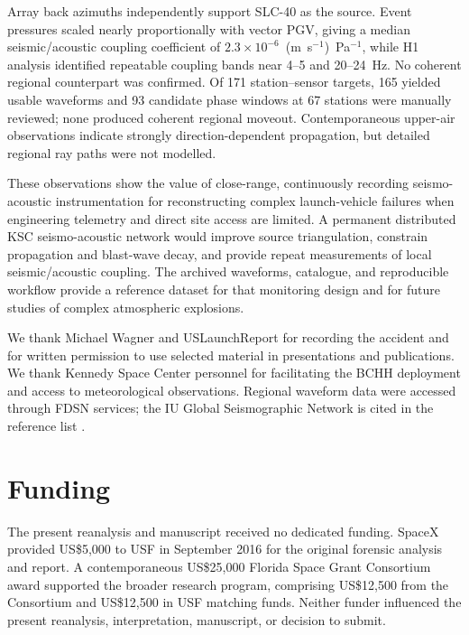 \documentclass[]{seismica}
\begin{document}
Array back azimuths independently support SLC-40 as the source. Event
pressures scaled nearly proportionally with vector PGV, giving a median
seismic/acoustic coupling coefficient of
$2.3\times10^{-6}$~(m~s$^{-1}$)~Pa$^{-1}$, while H1 analysis identified
repeatable coupling bands near 4--5 and 20--24~Hz. No coherent regional
counterpart was confirmed. Of 171 station--sensor targets, 165 yielded usable
waveforms and 93 candidate phase windows at 67 stations were manually
reviewed; none produced coherent regional moveout. Contemporaneous upper-air
observations indicate strongly direction-dependent propagation, but detailed
regional ray paths were not modelled.

These observations show the value of close-range, continuously recording
seismo-acoustic instrumentation for reconstructing complex launch-vehicle
failures when engineering telemetry and direct site access are limited. A
permanent distributed KSC seismo-acoustic network would improve source
triangulation, constrain propagation and blast-wave decay, and provide repeat
measurements of local seismic/acoustic coupling. The archived waveforms,
catalogue, and reproducible workflow provide a reference dataset for that
monitoring design and for future studies of complex atmospheric explosions.

\begin{acknowledgements}
We thank Michael Wagner and USLaunchReport for recording the accident and for
written permission to use selected material in presentations and publications.
We thank Kennedy Space Center personnel for facilitating the BCHH deployment
and access to meteorological observations. Regional waveform data were
accessed through FDSN services; the IU Global Seismographic Network is cited
in the reference list \citep{asl_gsn_iu_1988}.
\end{acknowledgements}

\section*{Funding}

The present reanalysis and manuscript received no dedicated funding. SpaceX
provided US\$5,000 to USF in September 2016 for the original forensic analysis
and report. A contemporaneous US\$25,000 Florida Space Grant Consortium award
supported the broader research program, comprising US\$12,500 from the
Consortium and US\$12,500 in USF matching funds. Neither funder influenced the
present reanalysis, interpretation, manuscript, or decision to submit.
\end{document}
